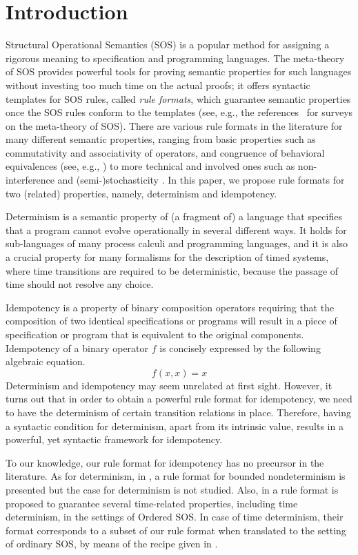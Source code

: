 \section{Introduction}
Structural Operational Semantics (SOS) \cite{Plotkin04a} is a popular method for assigning a rigorous meaning to
specification and programming languages.
The meta-theory of SOS provides powerful tools for proving semantic properties for such languages
without investing too much time on the actual proofs; it offers syntactic templates for SOS rules, called
\emph{rule formats},
which guarantee semantic properties once the SOS rules conform to the templates
(see, e.g., the references~\cite{Aceto01,Mousavi07-TCS} for surveys on the meta-theory of SOS).
There are various rule formats  in the literature for many different semantic properties, ranging from basic properties such as commutativity \cite{Mousavi05-IPL} and associativity \cite{Mousavi08-CONCUR} of operators, and congruence of behavioral equivalences (see, e.g., \cite{Verhoef95}) to more technical and involved ones such as non-interference \cite{Tini04} and (semi-)stochasticity \cite{Lanotte05}.
In this paper, we propose rule formats for two (related) properties, namely, determinism and idempotency.

Determinism is a semantic property of (a  fragment of) a language
that specifies that a program cannot evolve operationally in several different ways.
It holds for sub-languages of many process calculi and programming languages,
and it is also a crucial property for many formalisms for the description of timed systems, where time transitions are required to be deterministic, because the passage of time should not resolve any choice.

Idempotency is a property of binary composition operators requiring
that the composition of two identical specifications or programs
will result in a piece of specification or program that is equivalent to the original components.
Idempotency of a binary operator $f$ is concisely expressed by the following algebraic equation.
\[
f(x, x) = x
\]
Determinism and idempotency may seem unrelated at first sight.
However, it turns out that in order to obtain a powerful rule format
for idempotency, we need to have the determinism of certain transition relations in place. Therefore,
having a syntactic condition for determinism, apart from its intrinsic value,
results in a powerful, yet syntactic framework for idempotency.


To our knowledge, our rule format for idempotency has no precursor in the literature.
As for determinism, in \cite{Fokkink03a}, a rule format for bounded nondeterminism is presented but the case for determinism is not studied.
Also, in \cite{Ulidowski97b} a rule format is proposed to guarantee several time-related properties, including time determinism, in the settings of
Ordered SOS. In case of time determinism, their format corresponds to a subset of our rule format when translated to the setting of ordinary SOS, by means of the recipe given in \cite{Mousavi06-FSTTCS}.

